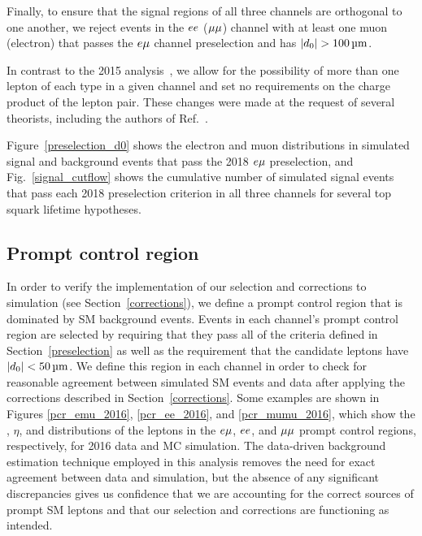 Finally, to ensure that the signal regions of all three channels are orthogonal to one another, we reject events in the $ee$ (${\mu}{\mu}$) channel with at least one muon (electron) that passes the $e{\mu}$ channel preselection and has $\ad>\SI{100}{\um}$.

In contrast to the 2015 analysis~\cite{displaced_leptons_bing}, we allow for the possibility of more than one lepton of each type in a given channel and set no requirements on the charge product of the lepton pair. These changes were made at the request of several theorists, including the authors of Ref.~\cite{Evans:2016zau}.

Figure~\ref{preselection_d0} shows the electron and muon \ad distributions in simulated signal and background events that pass the 2018 $e{\mu}$ preselection, and Fig.~\ref{signal_cutflow} shows the cumulative number of simulated signal events that pass each 2018 preselection criterion in all three channels for several top squark lifetime hypotheses.




\subsection{Prompt control region}
\label{pcr}
In order to verify the implementation of our selection and corrections to simulation (see Section~\ref{corrections}), we define a prompt control region that is dominated by SM background events. Events in each channel's prompt control region are selected by requiring that they pass all of the criteria defined in Section~\ref{preselection} as well as the requirement that the candidate leptons have $\ad<\SI{50}{\um}$. We define this region in each channel in order to check for reasonable agreement between simulated SM events and data after applying the corrections described in Section~\ref{corrections}. Some examples are shown in Figures \ref{pcr_emu_2016}, \ref{pcr_ee_2016}, and \ref{pcr_mumu_2016}, which show the \pt, $\eta$, and \ad distributions of the leptons in the $e{\mu}$, $ee$, and ${\mu}{\mu}$ prompt control regions, respectively, for 2016 data and MC simulation. The data-driven background estimation technique employed in this analysis removes the need for exact agreement between data and simulation, but the absence of any significant discrepancies gives us confidence that we are accounting for the correct sources of prompt SM leptons and that our selection and corrections are functioning as intended.

